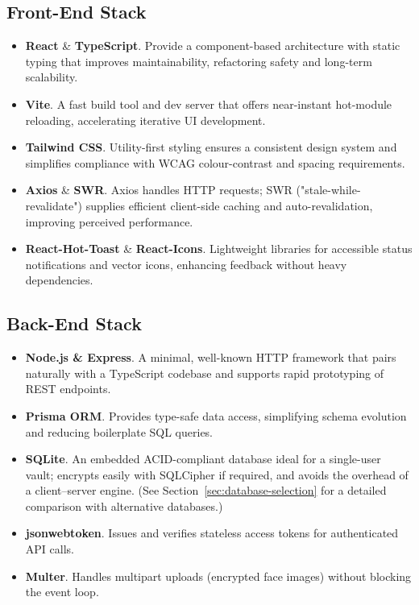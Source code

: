 \subsection*{Front-End Stack}
\begin{itemize}
  \item \textbf{React} \& \textbf{TypeScript}. Provide a component-based architecture with static typing that improves maintainability, refactoring safety and long-term scalability.
  \item \textbf{Vite}. A fast build tool and dev server that offers near-instant hot-module reloading, accelerating iterative UI development.
  \item \textbf{Tailwind CSS}. Utility-first styling ensures a consistent design system and simplifies compliance with WCAG colour-contrast and spacing requirements.
  \item \textbf{Axios} \& \textbf{SWR}. Axios handles HTTP requests; SWR ("stale-while-revalidate") supplies efficient client-side caching and auto-revalidation, improving perceived performance.
  \item \textbf{React-Hot-Toast} \& \textbf{React-Icons}. Lightweight libraries for accessible status notifications and vector icons, enhancing feedback without heavy dependencies.
\end{itemize}

\clearpage
\subsection*{Back-End Stack}
\begin{itemize}
  \item \textbf{Node.js \& Express}. A minimal, well-known HTTP framework that pairs naturally with a TypeScript codebase and supports rapid prototyping of REST endpoints.
  \item \textbf{Prisma ORM}. Provides type-safe data access, simplifying schema evolution and reducing boilerplate SQL queries.
  \item \textbf{SQLite}. An embedded ACID-compliant database ideal for a single-user vault; encrypts easily with SQLCipher if required, and avoids the overhead of a client–server engine. (See Section~\ref{sec:database-selection} for a detailed comparison with alternative databases.)
  \item \textbf{jsonwebtoken}. Issues and verifies stateless access tokens for authenticated API calls.
  \item \textbf{Multer}. Handles multipart uploads (encrypted face images) without blocking the event loop.
\end{itemize}

